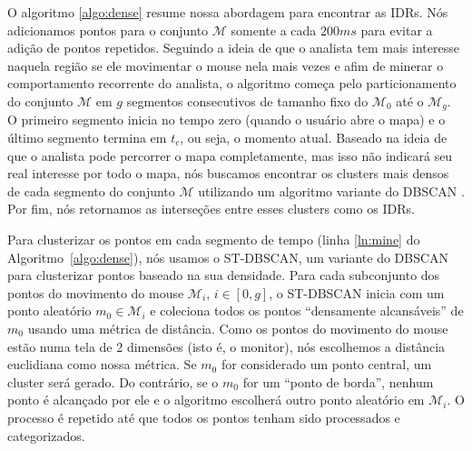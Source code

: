 O algoritmo \ref{algo:dense} resume nossa abordagem para encontrar as IDRs. Nós adicionamos pontos para o conjunto $\mathcal{M}$ somente a cada $200ms$ para evitar a adição de pontos repetidos. Seguindo a ideia de que o analista tem mais interesse naquela região se ele movimentar o mouse nela mais vezes e afim de minerar o comportamento recorrente do analista, o algoritmo começa pelo particionamento do conjunto $\mathcal{M}$ em $g$ segmentos consecutivos de tamanho fixo do $\mathcal{M}_0$ até o $\mathcal{M}_g$. O primeiro segmento inicia no tempo zero (quando o usuário abre o mapa) e o último segmento termina em $t_c$, ou seja, o momento atual. Baseado na ideia de que o analista pode percorrer o mapa completamente, mas isso não indicará seu real interesse por todo o mapa, nós buscamos encontrar os clusters mais densos de cada segmento do conjunto $\mathcal{M}$ utilizando um algoritmo variante do DBSCAN \cite{Ester:1996:DAD:3001460.3001507}. Por fim, nós retornamos as interseções entre esses clusters como os IDRs.



Para clusterizar os pontos em cada segmento de tempo (linha \ref{ln:mine} do Algoritmo~\ref{algo:dense}), nós usamos o ST-DBSCAN, um variante do DBSCAN para clusterizar pontos baseado na sua densidade. Para cada subconjunto dos pontos do movimento do mouse $\mathcal{M}_i$, $i \in [0,g]$, o ST-DBSCAN inicia com um ponto aleatório $m_0 \in \mathcal{M}_i$ e coleciona todos os pontos ``densamente alcansáveis'' de $m_0$ usando uma métrica de distância. Como os pontos do movimento do mouse estão numa tela de 2 dimensões (isto é, o monitor), nós escolhemos a distância euclidiana como nossa métrica. Se $m_0$ for considerado um ponto central,  um cluster será gerado. Do contrário, se o $m_0$ for um ``ponto de borda'', nenhum ponto é alcançado por ele e o algoritmo escolherá outro ponto aleatório em $\mathcal{M}_i$. O processo é repetido até que todos os pontos tenham sido processados e categorizados.


